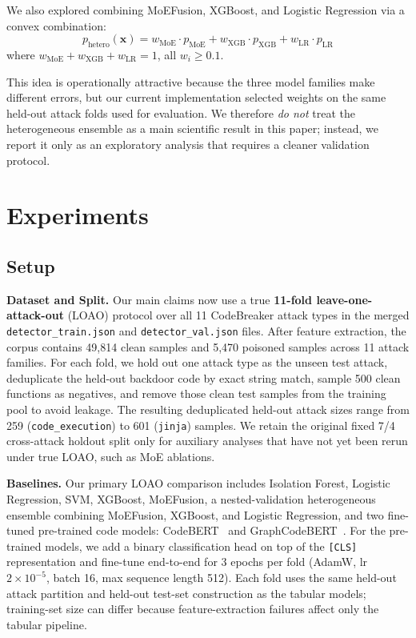 ﻿\documentclass[sigconf,review,anonymous]{acmart}
\newcommand{\sys}{MoEFusion}
\begin{document}
We also explored combining \sys{}, XGBoost, and Logistic Regression via a
convex combination:
\begin{equation}
p_{\text{hetero}}(\mathbf{x}) = w_{\text{MoE}} \cdot p_{\text{MoE}}
+ w_{\text{XGB}} \cdot p_{\text{XGB}} + w_{\text{LR}} \cdot p_{\text{LR}}
\end{equation}
where $w_{\text{MoE}} + w_{\text{XGB}} + w_{\text{LR}} = 1$, all $w_i \geq 0.1$.

This idea is operationally attractive because the three model families make
different errors, but our current implementation selected weights on the same
held-out attack folds used for evaluation.
We therefore \emph{do not} treat the heterogeneous ensemble as a main scientific
result in this paper; instead, we report it only as an exploratory analysis
that requires a cleaner validation protocol.


\section{Experiments}
\label{sec:experiments}

\subsection{Setup}
\label{sec:exp:setup}

\textbf{Dataset and Split.}
Our main claims now use a true \textbf{11-fold leave-one-attack-out} (LOAO)
protocol over all 11 CodeBreaker attack types in the merged
\texttt{detector\_train.json} and \texttt{detector\_val.json} files.
After feature extraction, the corpus contains 49,814 clean samples and 5,470
poisoned samples across 11 attack families.
For each fold, we hold out one attack type as the unseen test attack,
deduplicate the held-out backdoor code by exact string match, sample 500 clean
functions as negatives, and remove those clean test samples from the training
pool to avoid leakage.
The resulting deduplicated held-out attack sizes range from 259
(\texttt{code\_execution}) to 601 (\texttt{jinja}) samples.
We retain the original fixed 7/4 cross-attack holdout split only
for auxiliary analyses that have not yet been rerun under true LOAO, such as
MoE ablations.

\textbf{Baselines.}
Our primary LOAO comparison includes Isolation Forest, Logistic Regression, SVM,
XGBoost, \sys{}, a nested-validation heterogeneous ensemble combining
\sys{}, XGBoost, and Logistic Regression, and two fine-tuned pre-trained code
models: CodeBERT~\cite{feng2020codebert} and
GraphCodeBERT~\cite{guo2021graphcodebert}.
For the pre-trained models, we add a binary classification head on top of the
\texttt{[CLS]} representation and fine-tune end-to-end for 3 epochs per fold
(AdamW, lr $2{\times}10^{-5}$, batch 16, max sequence length 512).
Each fold uses the same held-out attack partition and held-out test-set
construction as the tabular models; training-set size can differ because
feature-extraction failures affect only the tabular pipeline.
\end{document}
